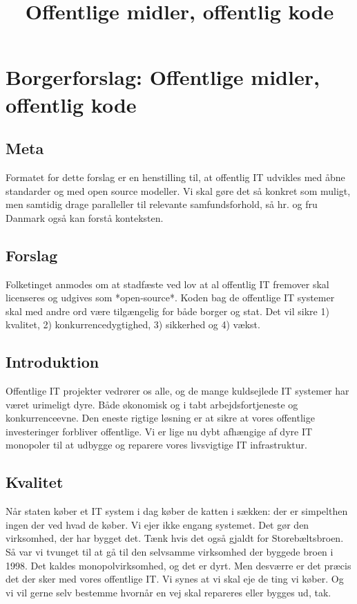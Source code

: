 \documentclass[fleqn]{article}
\title{Offentlige midler, offentlig kode}
\author{}
\begin{document}
\maketitle

\setcounter{secnumdepth}{0}

\section{Borgerforslag: Offentlige midler, offentlig kode}

\subsection{Meta}
Formatet for dette forslag er en henstilling til, at offentlig IT udvikles med åbne
standarder og med open source modeller. Vi skal gøre det så konkret som muligt, men 
samtidig drage paralleller til relevante samfundsforhold, så hr. og fru Danmark også 
kan forstå konteksten.

\subsection{Forslag}
\begin{large}
Folketinget anmodes om at stadfæste ved lov at al offentlig IT fremover skal licenseres
og udgives som *open-source*. Koden bag de offentlige IT systemer skal med andre ord
være tilgængelig for både borger og stat. Det vil sikre 1) kvalitet,
2) konkurrencedygtighed, 3) sikkerhed og 4) vækst.
\end{large}

\subsection{Introduktion}
Offentlige IT projekter vedrører os alle, og de mange kuldsejlede IT systemer har
været urimeligt dyre. Både økonomisk og i tabt arbejdsfortjeneste og konkurrenceevne.
Den eneste rigtige løsning er at sikre at vores offentlige investeringer forbliver
offentlige. Vi er lige nu dybt afhængige af dyre IT monopoler til at udbygge og
reparere vores livsvigtige IT infrastruktur.

\subsection{Kvalitet}
Når staten køber et IT system i dag køber de katten i sækken: der er simpelthen ingen
der ved hvad de køber. Vi ejer ikke engang systemet. Det gør den virksomhed, der har bygget
det. Tænk hvis det også gjaldt for Storebæltsbroen. Så var vi tvunget til at gå til den
selvsamme virksomhed der byggede broen i 1998. Det kaldes monopolvirksomhed, og det er dyrt.
Men desværre er det præcis det der sker med vores offentlige IT.
Vi synes at vi skal eje de ting vi køber. Og vi vil gerne selv bestemme hvornår en vej skal
repareres eller bygges ud, tak.
\end{document}
